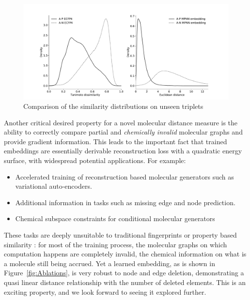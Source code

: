 \documentclass[journal=jacsat,manuscript=article]{achemso}
\begin{document}
\begin{figure}[hbtp]
\centering
\includegraphics[width=\textwidth]{data/ECFP4_Embedding_triplets.pdf}\caption{Comparison of the similarity distributions on unseen triplets}
\label{fig:ECFP4_Embedding_triplets}
\end{figure}

Another critical desired property for a novel molecular distance measure is the ability to correctly compare partial and \emph{chemically invalid} molecular graphs and provide gradient information. This leads to the important fact that trained embeddings are essentially derivable reconstruction loss with a quadratic energy surface, with widespread potential applications. For example:
\begin{itemize}
\item Accelerated training of reconstruction based molecular generators such as variational auto-encoders.
\item Additional information in tasks such as missing edge and node prediction.
\item Chemical subspace constraints for conditional molecular generators
\end{itemize}
These tasks are deeply unsuitable to traditional fingerprints or property based similarity : for most of the training process, the molecular graphs on which computation happens are completely invalid, the chemical information on what is a molecule still being accrued. Yet a learned embedding, as is shown in Figure~\ref{fig:Ablations}, is very robust to node and edge deletion, demonstrating a quasi linear distance relationship with the number of deleted elements. This is an exciting property, and we look forward to seeing it explored further.
\end{document}
